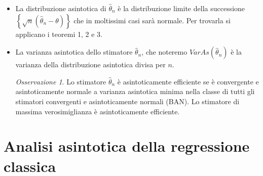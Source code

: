 \documentclass[a4paper]{report}
\theoremstyle{remark}
\newtheorem{remark}{Osservazione}
\newcounter{theor}
\begin{document}
\begin{itemize}
\item[{[1]}] La distribuzione asintotica di $\hat{\theta}_{n}$ \`{e} la
distribuzione limite della successione $\left\{ \sqrt{n}(\hat{\theta}%
_{n}-\theta )\right\} $ che in moltissimi casi sar\`{a} normale. Per
trovarla si applicano i teoremi 1, 2 e 3.

\item[{[2]}] La varianza asintotica dello stimatore $\hat{\theta}_{n}$, che
noteremo $VarAs(\hat{\theta}_{n})$ \`{e} la varianza della distribuzione
asintotica divisa per $n$.

\begin{remark}
Lo stimatore $\hat{\theta}_{n}$ \`{e} asintoticamente efficiente se \`{e}
convergente e asintoticamente normale a varianza asintotica minima nella
classe di tutti gli stimatori convergenti e asintoticamente normali (BAN).
Lo stimatore di massima verosimiglianza \`{e} asintoticamente efficiente.
\end{remark}
\end{itemize}

\section{Analisi asintotica della regressione classica}
\end{document}
